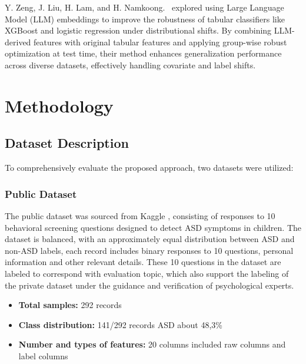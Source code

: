 \documentclass[conference]{IEEEtran}
\begin{document}
Y. Zeng, J. Liu, H. Lam, and H. Namkoong.~\cite{b6} explored using Large Language Model (LLM) embeddings to improve the robustness of tabular classifiers like XGBoost and logistic regression under distributional shifts. By combining LLM-derived features with original tabular features and applying group-wise robust optimization at test time, their method enhances generalization performance across diverse datasets, effectively handling covariate and label shifts.

\section{Methodology}
\subsection{Dataset Description}
To comprehensively evaluate the proposed approach, two datasets were utilized:

\subsubsection{Public Dataset}
The public dataset was sourced from Kaggle \cite{b18}, consisting of responses to 10 behavioral screening questions designed to detect ASD symptoms in children. The dataset is balanced, with an approximately equal distribution between ASD and non-ASD labels, each record includes binary responses to 10 questions, personal information and other relevant details. These 10 questions in the dataset are labeled to correspond with evaluation topic, which also support the labeling of the private dataset under the guidance and verification of psychological experts.
\begin{itemize}
    \item \textbf{Total samples:} 292 records
    \item \textbf{Class distribution:} 141/292 records ASD about 48,3\% 
    \item \textbf{Number and types of features:} 20 columns included raw columns and label columns
\end{itemize}
\end{document}
